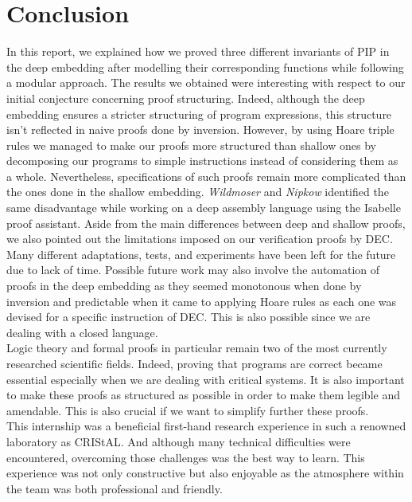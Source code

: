 \chapter{Conclusion}
In this report, we explained how we proved three different invariants of PIP in the deep embedding after modelling their corresponding functions while following a modular approach. The results we obtained were interesting with respect to our initial conjecture concerning proof structuring. Indeed, although the deep embedding ensures a stricter structuring of program expressions, this structure isn't reflected in naive proofs done by inversion. However, by using Hoare triple rules we managed to make our proofs more structured than shallow ones by decomposing our programs to simple instructions instead of considering them as a whole. Nevertheless, specifications of such proofs remain more complicated than the ones done in the shallow embedding. \textit{Wildmoser} and \textit{Nipkow} identified the same disadvantage while working on a deep assembly language using the Isabelle proof assistant\cite{Wildmoser}. Aside from the main differences between deep and shallow proofs, we also pointed out the limitations imposed on our verification proofs by DEC. \\

Many different adaptations, tests, and experiments have been left for the future due to lack of time. Possible future work may also involve the automation of proofs in the deep embedding as they seemed monotonous when done by inversion and predictable when it came to applying Hoare rules as each one was devised for a specific instruction of DEC. This is also possible since we are dealing with a closed language. \\

Logic theory and formal proofs in particular remain two of the most currently researched scientific fields. Indeed, proving that programs are correct became essential especially when we are dealing with critical systems. It is also important to make these proofs as structured as possible in order to make them legible and amendable. This is also crucial if we want to simplify further these proofs.  \\   

This internship was a beneficial first-hand research experience in such a renowned laboratory as CRIStAL. And although many technical difficulties were encountered, overcoming those challenges was the best way to learn. This experience was not only  constructive but also enjoyable as the atmosphere within the team was both professional and friendly. \\ 